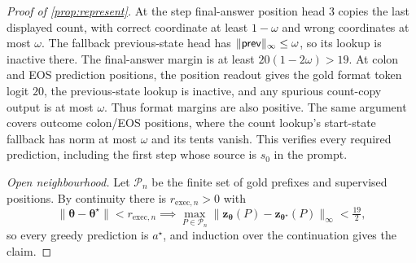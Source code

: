 \begin{proof}[Proof of \cref{prop:represent}]
At the step final-answer position head 3 copies the last displayed count, with correct coordinate at least $1-\omega$ and wrong coordinates at most $\omega$. The fallback previous-state head has $\|\mathsf{prev}\|_\infty\le\omega$, so its lookup is inactive there. The final-answer margin is at least $20(1-2\omega)>19$. At colon and EOS prediction positions, the position readout gives the gold format token logit $20$, the previous-state lookup is inactive, and any spurious count-copy output is at most $\omega$. Thus format margins are also positive. The same argument covers outcome colon/EOS positions, where the count lookup's start-state fallback has norm at most $\omega$ and its tents vanish. This verifies every required prediction, including the first step whose source is $s_0$ in the prompt.

\emph{Open neighbourhood.} Let $\mathcal P_n$ be the finite set of gold prefixes and supervised positions. By continuity there is
$r_{\mathrm{exec},n}>0$ with
\[
 \|\bm\theta-\bm\theta^\star\|<r_{\mathrm{exec},n}\implies\max_{P\in\mathcal P_n}\|\bm z_{\bm\theta}(P)-\bm z_{\bm\theta^\star}(P)\|_\infty<\tfrac{19}{2},
\]
so every greedy prediction is $a^\star$, and induction over the continuation gives the claim.
\end{proof}


